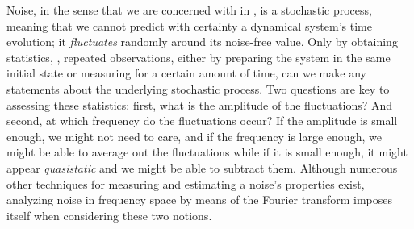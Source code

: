 Noise, in the sense that we are concerned with in \thethesis,
is a stochastic process, meaning that we cannot predict with certainty a dynamical system's time evolution; it \emph{fluctuates} randomly around its noise-free value.
Only by obtaining statistics, \ie, repeated observations, either by preparing the system in the same initial state or measuring for a certain amount of time, can we make any statements about the underlying stochastic process.
Two questions are key to assessing these statistics: first, what is the amplitude of the fluctuations?
And second, at which frequency do the fluctuations occur?
If the amplitude is small enough, we might not need to care, and if the frequency is large enough, we might be able to average out the fluctuations while if it is small enough, it might appear \emph{quasistatic} and we might be able to subtract them.
Although numerous other techniques for measuring and estimating a noise's properties exist, analyzing noise in frequency space by means of the Fourier transform imposes itself when considering these two notions.

